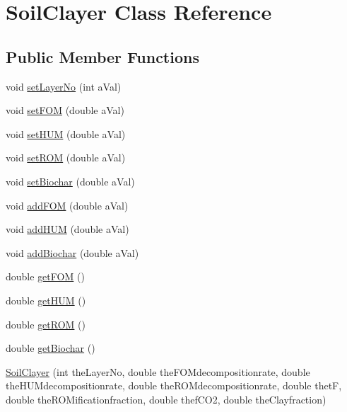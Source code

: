 \hypertarget{class_soil_clayer}{}\section{Soil\+Clayer Class Reference}
\label{class_soil_clayer}
\subsection*{Public Member Functions}
\begin{DoxyCompactItemize}
\item 
void \mbox{\hyperlink{class_soil_clayer_ad32a0095b99de4d49a69f8e1a67c680f}{set\+Layer\+No}} (int a\+Val)
\item 
void \mbox{\hyperlink{class_soil_clayer_a38b401bddeea29a506d613685d3fd9e7}{set\+F\+OM}} (double a\+Val)
\item 
void \mbox{\hyperlink{class_soil_clayer_a8bc3b2e41a50a85f8c4b98293acff103}{set\+H\+UM}} (double a\+Val)
\item 
void \mbox{\hyperlink{class_soil_clayer_a7688815873c1b9759a1701539b905883}{set\+R\+OM}} (double a\+Val)
\item 
void \mbox{\hyperlink{class_soil_clayer_aee7a8dc76945ac6f4797517bfe51c10e}{set\+Biochar}} (double a\+Val)
\item 
void \mbox{\hyperlink{class_soil_clayer_a9d4734c2cc8736bb04b2f7d163900eac}{add\+F\+OM}} (double a\+Val)
\item 
void \mbox{\hyperlink{class_soil_clayer_a221ec3644b0aef328a8615c26f99bfca}{add\+H\+UM}} (double a\+Val)
\item 
void \mbox{\hyperlink{class_soil_clayer_ad4ff61d6fc320884f78f259399baa800}{add\+Biochar}} (double a\+Val)
\item 
double \mbox{\hyperlink{class_soil_clayer_a871b01c2ee3de2487ea0d08f995b52e6}{get\+F\+OM}} ()
\item 
double \mbox{\hyperlink{class_soil_clayer_a812e0724750bf9f46786e8a87cae136b}{get\+H\+UM}} ()
\item 
double \mbox{\hyperlink{class_soil_clayer_ac51bdc01741ef3ea1ae864570c2cb0b6}{get\+R\+OM}} ()
\item 
double \mbox{\hyperlink{class_soil_clayer_ab9deb728c9bb9e7da4366d3d321a77f3}{get\+Biochar}} ()
\item 
\mbox{\hyperlink{class_soil_clayer_a15c997e1a6abeee1477fdac2bf0ecb6b}{Soil\+Clayer}} (int the\+Layer\+No, double the\+F\+O\+Mdecompositionrate, double the\+H\+U\+Mdecompositionrate, double the\+R\+O\+Mdecompositionrate, double thetF, double the\+R\+O\+Mificationfraction, double thef\+C\+O2, double the\+Clayfraction)

\end{DoxyCompactItemize}
